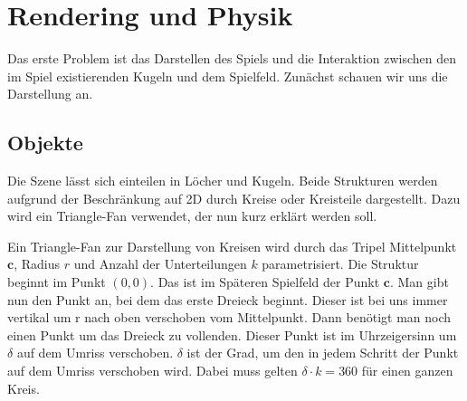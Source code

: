 \section{Rendering und Physik}
	Das erste Problem ist das Darstellen des Spiels und die Interaktion zwischen den im Spiel existierenden Kugeln und dem Spielfeld. Zunächst schauen wir uns die Darstellung an.
\subsection{Objekte}
	Die Szene lässt sich einteilen in Löcher und Kugeln. Beide Strukturen werden aufgrund der Beschränkung auf 2D durch Kreise oder Kreisteile dargestellt. Dazu wird ein Triangle-Fan verwendet, der nun kurz erklärt werden soll.
	
	Ein Triangle-Fan zur Darstellung von Kreisen wird durch das Tripel Mittelpunkt $\mathbf{c}$, Radius $r$ und Anzahl der Unterteilungen $k$ parametrisiert. 
	Die Struktur beginnt im Punkt $(0,0)$.
	Das ist im Späteren Spielfeld der Punkt $\mathbf{c}$.
	Man gibt nun den Punkt an, bei dem das erste Dreieck beginnt. Dieser ist bei uns immer vertikal um r nach oben verschoben vom Mittelpunkt. Dann benötigt man noch einen Punkt um das Dreieck zu vollenden. Dieser Punkt ist im Uhrzeigersinn um $\delta$ auf dem Umriss verschoben. 
	$\delta$ ist der Grad, um den in jedem Schritt der Punkt auf dem Umriss verschoben wird. 
	Dabei muss gelten $\delta \cdot k = 360$ für einen ganzen Kreis.

